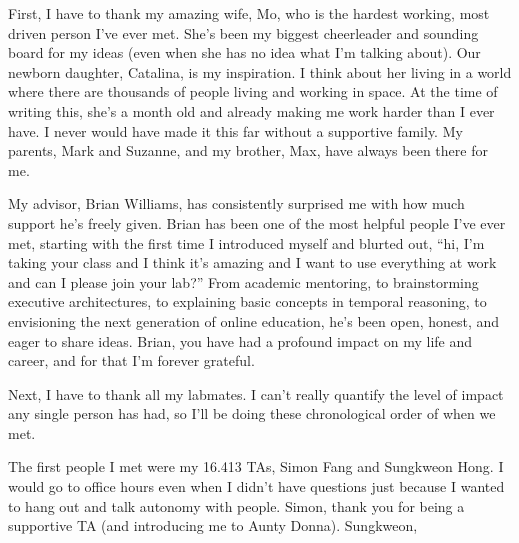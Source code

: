 \documentclass[10pt,leftblank,twoside]{mitthesis}
\begin{document}
First, I have to thank my amazing wife, Mo, who is the hardest working, most driven person I've ever
met. She's been my biggest cheerleader and sounding board for my ideas (even when she has no idea
what I'm talking about). Our newborn daughter, Catalina, is my inspiration. I think about her living
in a world where there are thousands of people living and working in space. At the time of writing
this, she's a month old and already making me work harder than I ever have. I never would have made
it this far without a supportive family. My parents, Mark and Suzanne, and my brother, Max, have
always been there for me.

My advisor, Brian Williams, has consistently surprised me with how much support he's freely given.
Brian has been one of the most helpful people I've ever met, starting with the first time I
introduced myself and blurted out, ``hi, I'm taking your class and I think it's amazing and I want to
use everything at work and can I please join your lab?'' From academic mentoring, to brainstorming
executive architectures, to explaining basic concepts in temporal reasoning, to envisioning the next
generation of online education, he's been open, honest, and eager to share ideas. Brian, you have
had a profound impact on my life and career, and for that I'm forever grateful.

Next, I have to thank all my labmates. I can't really quantify the level of impact any single person
has had, so I'll be doing these chronological order of when we met.

The first people I met were my 16.413 TAs, Simon Fang and Sungkweon Hong. I would go to office hours
even when I didn't have questions just because I wanted to hang out and talk autonomy with people.
Simon, thank you for being a supportive TA (and introducing me to Aunty Donna). Sungkweon,

\pagestyle{plain}

\tableofcontents
\newpage
\listoffigures
\newpage
\renewcommand\listoflistingscaption{List of source codes}
\listoflistings
\newpage
\listoftables
\end{document}
